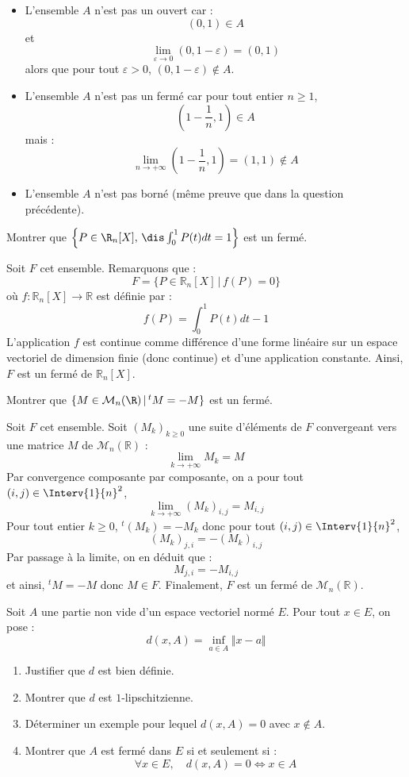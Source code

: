 \documentclass[a4paper,10pt]{report}
\begin{document}
\begin{enumerate}
\begin{itemize}
\item L'ensemble $A$ n'est pas un ouvert car :
$$ (0,1) \in A$$
et 
$$ \lim_{\varepsilon \rightarrow 0} (0,1- \varepsilon) = (0,1)$$
alors que pour tout $\varepsilon>0$, $(0,1- \varepsilon) \notin A$. 
\item L'ensemble $A$ n'est pas un fermé car  pour tout entier $n \geq 1$,
$$ \left(1- \dfrac{1}{n},1\right) \in A$$
mais :
$$ \lim_{n \rightarrow + \infty} \left(1- \dfrac{1}{n},1\right) = (1,1) \notin A$$
\item L'ensemble $A$ n'est pas borné (même preuve que dans la question précédente).
\end{itemize}
\end{enumerate}

\begin{Exa} Montrer que $\left\{P\in\R_n[X], \, \dis\int_0^1P(t)dt= 1\right\}$ est un fermé.
\end{Exa}

\corr Soit $F$ cet ensemble. Remarquons que :
$$ F = \lbrace P \in \mathbb{R}_n[X] \, \vert \, f(P)=0 \rbrace$$
où $f: \mathbb{R}_n[X] \rightarrow \mathbb{R}$ est définie par :
$$ f(P)= \int_0^1P(t)dt-1$$
L'application $f$ est continue comme différence d'une forme linéaire sur un espace vectoriel de dimension finie (donc continue) et d'une application constante. Ainsi, $F$ est un fermé de $\mathbb{R}_n[X]$.

\begin{Exa} Montrer que $\{M\in{\cal M}_n(\R) \, \vert \,  ^tM=-M\}$ est un fermé.
\end{Exa}

\corr Soit $F$ cet ensemble. Soit $(M_k)_{k \geq 0}$ une suite d'éléments de $F$ convergeant vers une matrice $M$ de $\mathcal{M}_n(\mathbb{R})$ :
$$ \lim_{k \rightarrow + \infty} M_k = M$$
Par convergence composante par composante, on a pour tout $(i,j) \in \Interv{1}{n}^2$,
$$  \lim_{k \rightarrow + \infty} (M_k)_{i,j} = M_{i,j}$$
Pour tout entier $k \geq 0$, $^t(M_k)=-M_k$ donc pour tout $(i,j) \in \Interv{1}{n}^2$,
$$ (M_k)_{j,i} = - (M_k)_{i,j}$$
Par passage à la limite, on en déduit que :
$$ M_{j,i}=-M_{i,j}$$
et ainsi, $^t M=-M$ donc $M \in F$. Finalement, $F$ est un fermé de $\mathcal{M}_n(\mathbb{R})$.

\begin{Exa} Soit $A$ une partie non vide d'un espace vectoriel normé $E$. Pour tout $x \in E$, on pose :
$$d(x,A) = \inf_{a \in A} \Vert x- a \Vert$$

\begin{enumerate}
\item Justifier que $d$ est bien définie.
\item Montrer que $d$ est $1$-lipschitzienne.
\item Déterminer un exemple pour lequel $d(x,A)=0$ avec $x \notin A$.
\item Montrer que $A$ est fermé dans $E$ si et seulement si :
$$ \forall x \in E, \quad d(x,A)=0 \Longleftrightarrow x \in A $$
\end{enumerate}
\end{Exa}
\end{document}
